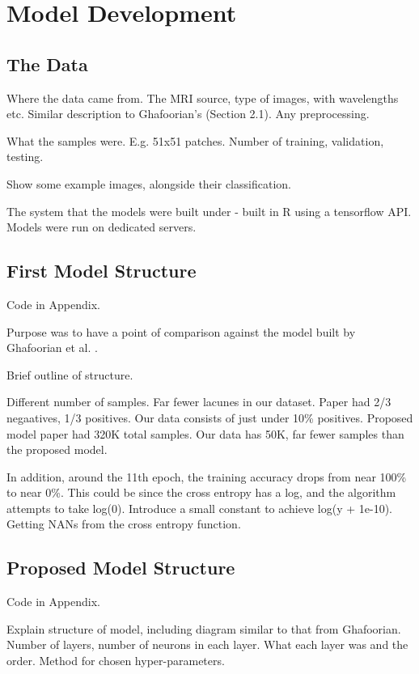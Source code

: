 %
%

\chapter{Model Development}\label{model}

\section{The Data}

Where the data came from. The MRI source, type of images, with wavelengths etc. Similar description to Ghafoorian's (Section 2.1). Any preprocessing.

What the samples were. E.g. 51x51 patches. Number of training, validation, testing.

Show some example images, alongside their classification.

The system that the models were built under - built in R using a tensorflow API. Models were run on dedicated servers.

\section{First Model Structure}

Code in Appendix.

Purpose was to have a point of comparison against the model built by Ghafoorian et al. \cite{GhafoorianM.2017Dml3}.

Brief outline of structure.

Different number of samples. Far fewer lacunes in our dataset. Paper had 2/3 negaatives, 1/3 positives. Our data consists of just under 10\% positives. Proposed model paper had 320K total samples. Our data has 50K, far fewer samples than the proposed model.

In addition, around the 11th epoch, the training accuracy drops from near 100\% to near 0\%. This could be since the cross entropy has a log, and the algorithm attempts to take log(0). Introduce a small constant to achieve log(y + 1e-10).
Getting NANs from the cross entropy function.


\section{Proposed Model Structure}

Code in Appendix.

Explain structure of model, including diagram similar to that from Ghafoorian. Number of layers, number of neurons in each layer. What each layer was and the order. Method for chosen hyper-parameters. 




%